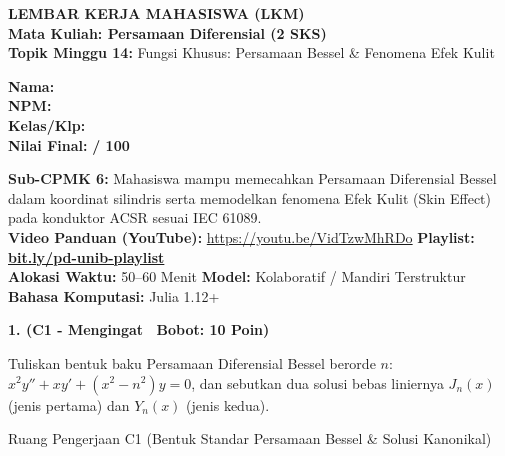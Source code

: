 \documentclass[10pt,a4paper]{article}
\begin{document}
\noindent\begin{minipage}[c]{0.68\textwidth}%
  {\large\textbf{\color{unibblue}LEMBAR KERJA MAHASISWA (LKM)}}\\[1mm]
  {\normalsize\textbf{Mata Kuliah: Persamaan Diferensial (2 SKS)}}\\[0.5mm]
  {\small\textbf{Topik Minggu 14:} Fungsi Khusus: Persamaan Bessel \& Fenomena Efek Kulit}%
\end{minipage}%
\hfill%
\begin{minipage}[c]{0.30\textwidth}%
  \begin{tcolorbox}[colback=unibblue!5,colframe=unibblue,boxrule=0.6pt,arc=2pt,left=4pt,right=4pt,top=2pt,bottom=2pt]
    \scriptsize
    \textbf{Nama:} \dotfill\\[1.2mm]
    \textbf{NPM:} \dotfill\\[1.2mm]
    \textbf{Kelas/Klp:} \dotfill\\[1.2mm]
    \textbf{Nilai Final:} \hfill \textbf{/ 100}
  \end{tcolorbox}%
\end{minipage}\par

\vspace{1.5mm}

\begin{tcolorbox}[colback=boxbg,colframe=unibgold!90!black,boxrule=0.6pt,arc=2pt,left=5pt,right=5pt,top=3pt,bottom=3pt,title=\textbf{\scriptsize Capaian Pembelajaran (Sub-CPMK 6) \& Pedoman Evaluasi OBE}]
  \scriptsize
  \textbf{Sub-CPMK 6:} Mahasiswa mampu memecahkan Persamaan Diferensial Bessel dalam koordinat silindris serta memodelkan fenomena Efek Kulit (Skin Effect) pada konduktor ACSR sesuai IEC 61089.\\
  \textbf{Video Panduan (YouTube):} \url{https://youtu.be/VidTzwMhRDo} \hfill \textbf{Playlist:} \href{https://www.youtube.com/playlist?list=PLS5oOZWXZeTw}{\color{unibblue}\textbf{bit.ly/pd-unib-playlist}}\\\textbf{Alokasi Waktu:} 50--60 Menit \quad\textbar\quad \textbf{Model:} Kolaboratif / Mandiri Terstruktur \quad\textbar\quad \textbf{Bahasa Komputasi:} Julia 1.12+
\end{tcolorbox}

\vspace{1mm}

\noindent\textbf{1. (C1 - Mengingat \textbar\ Bobot: 10 Poin)}\par\vspace{0.5mm}
{\footnotesize Tuliskan bentuk baku Persamaan Diferensial Bessel berorde $n$: $x^2 y'' + x y' + (x^2 - n^2) y = 0$, dan sebutkan dua solusi bebas liniernya $J_n(x)$ (jenis pertama) dan $Y_n(x)$ (jenis kedua).}
\begin{answerbox}{Ruang Pengerjaan C1 (Bentuk Standar Persamaan Bessel \& Solusi Kanonikal)}
  \vspace{2.0cm}
\end{answerbox}
\end{document}
